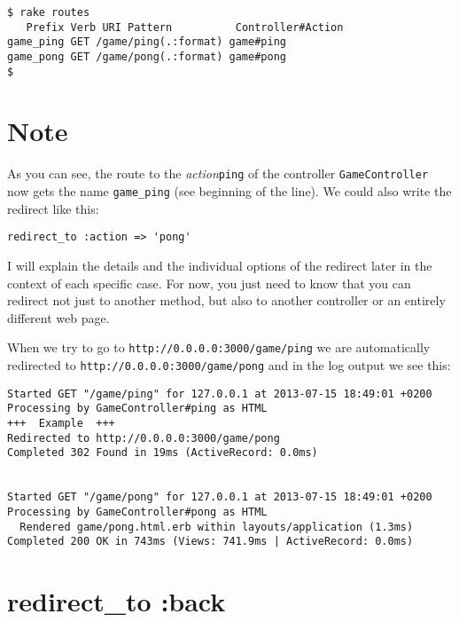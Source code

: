 \documentclass[a4paper]{book}
\begin{document}
\begin{shaded}\begin{verbatim}
$ rake routes
   Prefix Verb URI Pattern          Controller#Action
game_ping GET /game/ping(.:format) game#ping
game_pong GET /game/pong(.:format) game#pong
$
\end{verbatim}\end{shaded}

\section{Note}\label{note-19}

As you can see, the route to the \emph{action}\texttt{ping} of the controller \texttt{GameController} now gets the name \texttt{game\_ping} (see beginning of the line). We could also write the redirect like this:

\begin{shaded}\begin{verbatim}
redirect_to :action => 'pong'
\end{verbatim}\end{shaded}

I will explain the details and the individual options of the redirect later in the context of each specific case. For now, you just need to know that you can redirect not just to another method, but also to another controller or an entirely different web page.

When we try to go to \texttt{http://0.0.0.0:3000/game/ping} we are automatically redirected to \texttt{http://0.0.0.0:3000/game/pong} and in the log output we see this:

\begin{shaded}\begin{verbatim}
Started GET "/game/ping" for 127.0.0.1 at 2013-07-15 18:49:01 +0200
Processing by GameController#ping as HTML
+++  Example  +++
Redirected to http://0.0.0.0:3000/game/pong
Completed 302 Found in 19ms (ActiveRecord: 0.0ms)


Started GET "/game/pong" for 127.0.0.1 at 2013-07-15 18:49:01 +0200
Processing by GameController#pong as HTML
  Rendered game/pong.html.erb within layouts/application (1.3ms)
Completed 200 OK in 743ms (Views: 741.9ms | ActiveRecord: 0.0ms)
\end{verbatim}\end{shaded}

\section{redirect\_to :back}\label{redirectux5fto-back}
\end{document}

